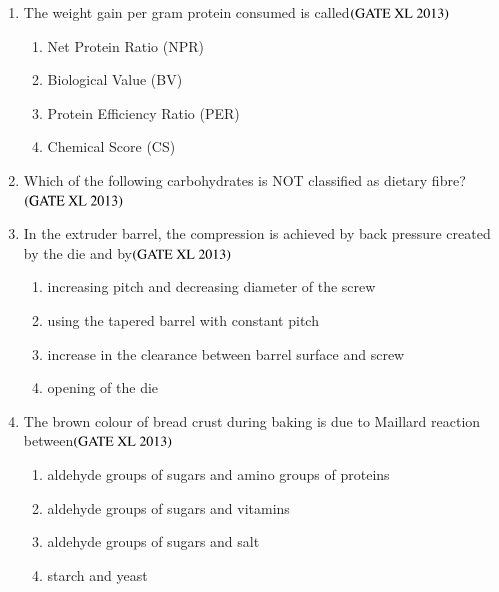 \documentclass[journal]{IEEEtran}
\begin{document}
\begin{enumerate}
\item The weight gain  per gram protein consumed is called\hfill $\left(\text{GATE XL 2013}\right)$
\begin{enumerate}
    \item Net Protein Ratio (NPR)
    \item Biological Value (BV)
    \item Protein Efficiency Ratio (PER)
    \item Chemical Score (CS)
\end{enumerate}

\item Which of the following carbohydrates is NOT classified as dietary fibre?\hfill $\left(\text{GATE XL 2013}\right)$
\begin{enumerate}
\end{enumerate}

\item In the extruder barrel, the compression is achieved by back pressure created by the die and by\hfill $\left(\text{GATE XL 2013}\right)$
\begin{enumerate}
    \item increasing pitch and decreasing diameter of the screw
    \item using the tapered barrel with constant pitch
    \item increase in the clearance between barrel surface and screw
    \item opening of the die
\end{enumerate}

\item The brown colour of bread crust during baking is due to Maillard reaction between\hfill $\left(\text{GATE XL 2013}\right)$
\begin{enumerate}
    \item aldehyde groups of sugars and amino groups of proteins
    \item aldehyde groups of sugars and vitamins
    \item aldehyde groups of sugars and salt
    \item starch and yeast
\end{enumerate}


\end{enumerate}
\end{document}
